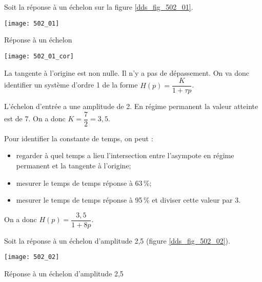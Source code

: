 \normaltrue \difficilefalse \tdifficilefalse
\correctiontrue


\newpage
{}
\setcounter{question}{0}%
\ifcorrection
\else
{}
\fi


\ifprof 
\else
Soit la réponse à un échelon sur la figure \ref{dds_fig_502_01}.
\begin{marginfigure}
\texttt{[image: 502\_01]}
\caption{Réponse à un échelon \label{dds_fig_502_01}}
\end{marginfigure}
\fi

\ifprof
\begin{marginfigure}
\texttt{[image: 502\_01\_cor]}
\end{marginfigure}

La tangente à l'origine est non nulle. Il n'y a pas de dépassement. On va donc identifier un système d'ordre 1 de la forme $H(p)=\dfrac{K}{1+\tau p}$.

L'échelon d'entrée a une amplitude de 2. En régime permanent la valeur atteinte est de 7. On a donc $K = \dfrac{7}{2}=3,5$.

Pour identifier la constante de temps, on peut : 
\begin{itemize}
\item regarder à quel temps a lieu l'intersection entre l'asympote en régime permanent et la tangente à l'origine;

\item mesurer le temps de temps réponse à 63\,\%;

\item mesurer le temps de temps réponse à 95\,\% et diviser cette valeur par 3.
\end{itemize}

On a donc $H(p)=\dfrac{3,5}{1+8p}$.
\else
\fi



\ifprof 
\else
Soit la réponse à un échelon d'amplitude 2,5 (figure \ref{dds_fig_502_02}).

\begin{marginfigure}
\texttt{[image: 502\_02]}
\caption{Réponse à un échelon d'amplitude 2,5 \label{dds_fig_502_02}}
\end{marginfigure}
\fi

